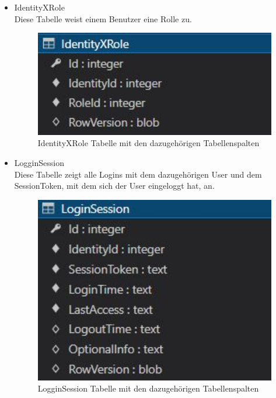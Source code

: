 \begin{itemize}
    \item IdentityXRole\\
    Diese Tabelle weist einem Benutzer eine Rolle zu.
    \begin{figure}[H]
        \centering
        \includegraphics[width=1\textwidth]{pics/IdentityXRoleStructure.JPG}
        \caption{IdentityXRole Tabelle mit den dazugehörigen Tabellenspalten}
    \end{figure}
\end{itemize}


\begin{itemize}
    \item LogginSession\\
    Diese Tabelle zeigt alle Logins mit dem dazugehörigen User und dem SessionToken, mit dem sich der User eingeloggt hat, an.
    \begin{figure}[H]
        \centering
        \includegraphics[width=1\textwidth]{pics/LoginSessionStructure.JPG}
        \caption{LogginSession Tabelle mit den dazugehörigen Tabellenspalten}
    \end{figure}
\end{itemize}

